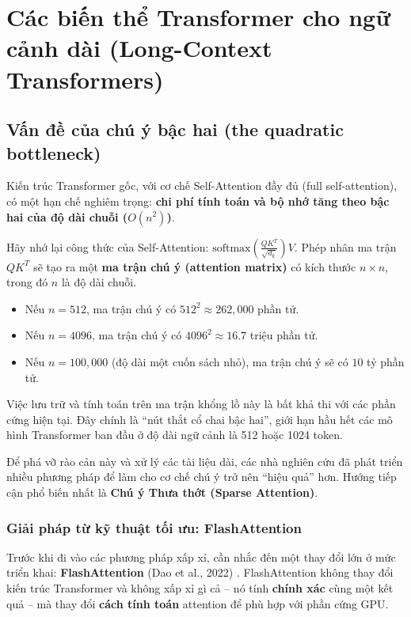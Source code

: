 
\section{Các biến thể Transformer cho ngữ cảnh dài (Long-Context Transformers)}
\label{sec:long_context_transformers}

\subsection{Vấn đề của chú ý bậc hai (the quadratic bottleneck)}
\label{ssec:quadratic_bottleneck}

Kiến trúc Transformer gốc, với cơ chế Self-Attention đầy đủ (full self-attention), có một hạn chế nghiêm trọng: \textbf{chi phí tính toán và bộ nhớ tăng theo bậc hai của độ dài chuỗi ($O(n^2)$)}.

Hãy nhớ lại công thức của Self-Attention: $\text{softmax}\left(\frac{QK^T}{\sqrt{d_k}}\right)V$. Phép nhân ma trận $QK^T$ sẽ tạo ra một \textbf{ma trận chú ý (attention matrix)} có kích thước $n \times n$, trong đó $n$ là độ dài chuỗi.
\begin{itemize}
    \item Nếu $n = 512$, ma trận chú ý có $512^2 \approx 262,000$ phần tử.
    \item Nếu $n = 4096$, ma trận chú ý có $4096^2 \approx 16.7$ triệu phần tử.
    \item Nếu $n = 100,000$ (độ dài một cuốn sách nhỏ), ma trận chú ý sẽ có $10$ tỷ phần tử.
\end{itemize}
Việc lưu trữ và tính toán trên ma trận khổng lồ này là bất khả thi với các phần cứng hiện tại. Đây chính là “nút thắt cổ chai bậc hai”, giới hạn hầu hết các mô hình Transformer ban đầu ở độ dài ngữ cảnh là 512 hoặc 1024 token.

Để phá vỡ rào cản này và xử lý các tài liệu dài, các nhà nghiên cứu đã phát triển nhiều phương pháp để làm cho cơ chế chú ý trở nên “hiệu quả” hơn. Hướng tiếp cận phổ biến nhất là \textbf{Chú ý Thưa thớt (Sparse Attention)}.
\subsubsection{Giải pháp từ kỹ thuật tối ưu: FlashAttention}
\label{sssec:flashattention}
Trước khi đi vào các phương pháp xấp xỉ, cần nhắc đến một thay đổi lớn ở mức triển khai: \textbf{FlashAttention} (Dao et al., 2022) \cite{dao2022flashattention}. FlashAttention không thay đổi kiến trúc Transformer và không xấp xỉ gì cả -- nó tính \textbf{chính xác} cùng một kết quả -- mà thay đổi \textbf{cách tính toán} attention để phù hợp với phần cứng GPU.

